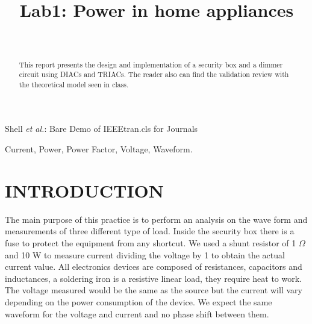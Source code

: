 \documentclass[journal]{IEEEtran}
\begin{document}
\title{\textbf{Lab1: Power in home appliances}}
\author{
  \\
}

%
{Shell \MakeLowercase{\textit{et al.}}: Bare Demo of IEEEtran.cls 
for Journals}
	
\maketitle

\begin{abstract}
This report presents the design and implementation 
of a security box and a dimmer circuit using DIACs 
and TRIACs. The reader also can find  the validation 
review with the theoretical model seen in class.    
\end{abstract}


\begin{IEEEkeywords}  
Current, Power, Power Factor, Voltage, Waveform.
\end{IEEEkeywords}

\IEEEpeerreviewmaketitle

\section{INTRODUCTION}

The main purpose of this practice is to perform an 
analysis on the wave form and measurements of three 
different type of load. Inside the security box there 
is a fuse to protect the equipment from any shortcut. 
We used a shunt resistor of 1 $\Omega$ and 10 W to measure 
current dividing the voltage by 1 to obtain the actual 
current value. All electronics devices are composed of
resistances, capacitors and inductances, a soldering iron 
is a resistive linear load, they require 
heat to work. The voltage measured would be the same 
as the source but the current will vary depending on 
the power consumption of the device. We expect the same 
waveform for the voltage and current and no 
phase shift between them.\\
\end{document}
